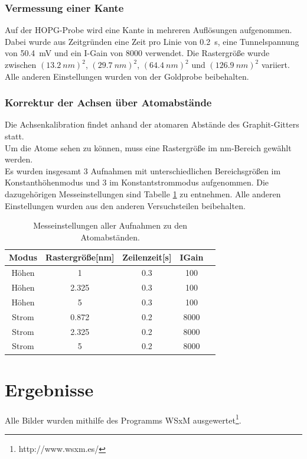 \documentclass[12pt,a4paper]{article}
\begin{document}
\subsubsection{Vermessung einer Kante}
Auf der HOPG-Probe wird eine Kante in mehreren Auflösungen aufgenommen. Dabei wurde aus Zeitgründen eine Zeit pro Linie von \SI{0,2}{s}, eine Tunnelspannung von \SI{50,4}{mV} und ein I-Gain von 8000 verwendet. Die Rastergröße wurde zwischen $(\SI{13,2}{nm})^2$, $(\SI{29,7}{nm})^2$, $(\SI{64,4}{nm})^2$ und $(\SI{126,9}{nm})^2$ variiert. Alle anderen Einstellungen wurden von der Goldprobe beibehalten.

\subsubsection{Korrektur der Achsen über Atomabstände}
Die Achsenkalibration findet anhand der atomaren Abstände des Graphit-Gitters statt.\\
Um die Atome sehen zu können, muss eine Rastergröße im nm-Bereich gewählt werden.\\
Es wurden insgesamt 3 Aufnahmen mit unterschiedlichen Bereichsgrößen im Konstanthöhenmodus und 3 im Konstantstrommodus aufgenommen. Die dazugehörigen Messeinstellungen sind Tabelle \ref{tab:Atome_Einstellungen} zu entnehmen. Alle anderen Einstellungen wurden aus den anderen Versuchsteilen beibehalten.\\


\begin{table}
\centering
\begin{tabular}{|c|c|c|c|c|}
\hline 
Modus & Rastergröße[nm] & Zeilenzeit[s] & IGain\\ 
\hline 
Höhen & 1 & 0.3 & 100\\ 
\hline 
Höhen & 2.325 & 0.3 & 100\\ 
\hline 
Höhen & 5 & 0.3 & 100\\ 
\hline 
Strom & 0.872 & 0.2 & 8000\\ 
\hline 
Strom & 2.325 & 0.2 & 8000\\ 
\hline 
Strom & 5 & 0.2 & 8000\\ 
\hline 
\end{tabular} 
\caption{Messeinstellungen aller Aufnahmen zu den Atomabständen.}
\label{tab:Atome_Einstellungen}
\end{table}

\section{Ergebnisse}
Alle Bilder wurden mithilfe des Programms WSxM ausgewertet\footnote{http://www.wsxm.es/}.
\end{document}
